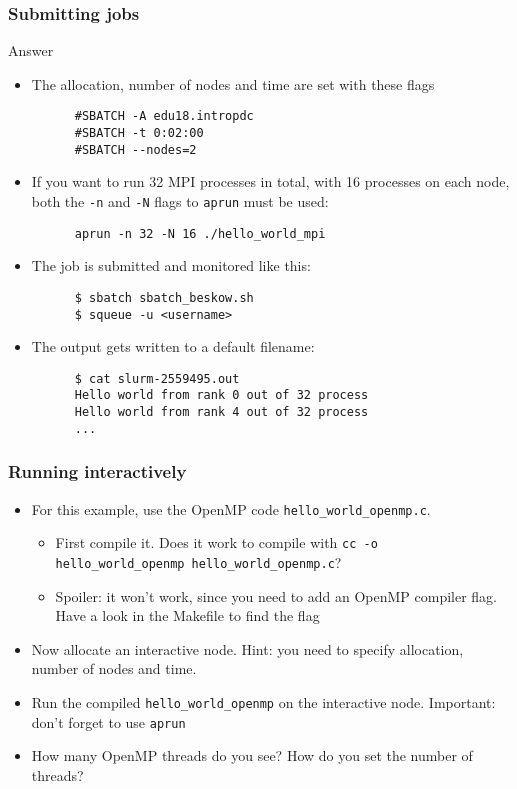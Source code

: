 \begin{frame}[fragile]
  \frametitle{Submitting jobs}
\begin{exampleblock}{{Answer}}
    \verbatimfont{\footnotesize}
    \begin{itemize}
    \item The allocation, number of nodes and time are set with these flags
    \begin{verbatim}
      #SBATCH -A edu18.intropdc
      #SBATCH -t 0:02:00
      #SBATCH --nodes=2
    \end{verbatim}
    \item If you want to run 32 MPI processes in total, with 16 processes on each node, both the \verb|-n| and \verb|-N| flags 
      to \verb|aprun| must be used:
    \begin{verbatim}
      aprun -n 32 -N 16 ./hello_world_mpi
    \end{verbatim}
    \item The job is submitted and monitored like this:
    \begin{verbatim}
      $ sbatch sbatch_beskow.sh
      $ squeue -u <username>
    \end{verbatim}
    \item The output gets written to a default filename:
    \begin{verbatim}
      $ cat slurm-2559495.out
      Hello world from rank 0 out of 32 process
      Hello world from rank 4 out of 32 process
      ...
    \end{verbatim}

    \end{itemize}

\end{exampleblock}
\end{frame}


\begin{frame}[fragile]
  \frametitle{Running interactively}
\begin{itemize}
  \item For this example, use the OpenMP code \verb|hello_world_openmp.c|.
    \begin{itemize}
      \item First compile it. Does it work to compile with \verb|cc -o hello_world_openmp hello_world_openmp.c|?
      \item Spoiler: it won't work, since you need to add an OpenMP compiler flag. Have a look in
        the Makefile to find the flag
    \end{itemize}
  \item Now allocate an interactive node. Hint: you need to specify allocation, number of nodes and time.
  \item Run the compiled \verb|hello_world_openmp| on the interactive node. Important: don't forget to use \verb|aprun|
  \item How many OpenMP threads do you see? How do you set the number of threads?
\end{itemize}
\end{frame}


